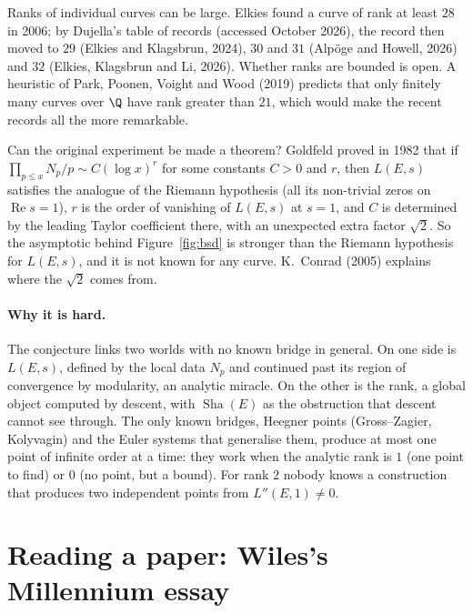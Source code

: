 \begin{remark}[records]\label{rem:records}
Ranks of individual curves can be large. Elkies found a curve of rank at least $28$ in 2006; by Dujella's table of records (accessed October 2026), the record
then moved to $29$ (Elkies and Klagsbrun, 2024), $30$ and $31$ (Alp\"oge and Howell, 2026) and $32$ (Elkies, Klagsbrun and Li, 2026). Whether ranks are bounded
is open. A heuristic of Park, Poonen, Voight and Wood (2019) predicts that only finitely many curves over $\Q$ have rank greater than $21$, which would
make the recent records all the more remarkable.
\end{remark}

\begin{remark}\label{rem:goldfeld}
Can the original experiment be made a theorem? Goldfeld proved in 1982 that if $\prod_{p\le x}N_p/p\sim C(\log x)^r$ for some constants $C>0$ and $r$, then
$L(E,s)$ satisfies the analogue of the Riemann hypothesis (all its non-trivial zeros on $\operatorname{Re}s=1$), $r$ is the order of vanishing of $L(E,s)$ at
$s=1$, and $C$ is determined by the leading Taylor coefficient there, with an unexpected extra factor $\sqrt2$. So the asymptotic behind
Figure~\ref{fig:bsd} is stronger than the Riemann hypothesis for $L(E,s)$, and it is not known for any curve. K.~Conrad (2005) explains where the
$\sqrt2$ comes from.
\end{remark}

\paragraph{Why it is hard.} The conjecture links two worlds with no known bridge in general. On one side is $L(E,s)$, defined by the local data $N_p$ and
continued past its region of convergence by modularity, an analytic miracle. On the other is the rank, a global object computed by descent, with $\operatorname{Sha}(E)$ as the
obstruction that descent cannot see through. The only known bridges, Heegner points (Gross--Zagier, Kolyvagin) and the Euler systems that generalise them,
produce at most one point of infinite order at a time: they work when the analytic rank is $1$ (one point to find) or $0$ (no point, but a bound). For
rank $2$ nobody knows a construction that produces two independent points from $L''(E,1)\ne0$.

\section{Reading a paper: Wiles's Millennium essay}


